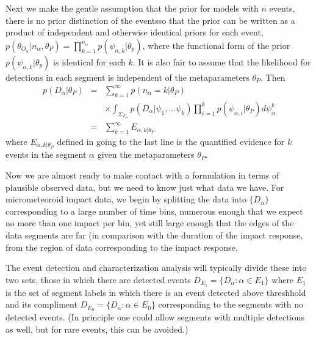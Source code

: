 \documentclass[twocolumn,showpacs,aps,prd,nobibnotes,nofootinbib,floatfix]{revtex4-1}
\begin{document}
Next we make the gentle assumption that the prior for models with $n$ events, there is no prior distinction of the eventsso that the prior can be written as a product of independent and otherwise identical priors for each event,$p(\theta_{O_\alpha}|n_\alpha,\theta_P)=\prod_{k{=}1}^{n_\alpha}p(\psi_{\alpha,k}|\theta_p)$, where the functional form of the prior $p(\psi_{\alpha,k}|\theta_p)$ is identical for each $k$.  It is also fair to assume that the likelihood for detections in each segment is independent of the metaparameters $\theta_P$. Then
\begin{eqnarray}
  p(D_\alpha|\theta_P)&=&\sum_{k{=}1}^{\infty}p(n_\alpha{=}k|\theta_P)\nonumber\\
  &&\times
  \int_{\Sigma_{E_\alpha}} p(D_\alpha|{\psi_1,...\psi_k}) \prod_{i{=}1}^k p(\psi_{\alpha,i}|\theta_P)d\psi_{\alpha}^k\nonumber\\
  &=&\sum_{k{=}1}^{\infty}E_{\alpha,k|\theta_P}\label{eq:sectionedLike}
\end{eqnarray}
where $E_{\alpha,k|\theta_P}$ defined in going to the last line is the quantified evidence for $k$ events in the segment $\alpha$ given the metaparameters $\theta_P$.

Now we are almost ready to make contact with a formulation in terms of plausible observed data, but we need to know just what data we have.  For micrometeoroid impact data, we begin by splitting the data into $\{D_\alpha\}$  corresponding to a large number of time bins, numerous enough that we expect no more than one impact per bin, yet still large enough that the edges of the data segments are far (in comparison with the duration of the impact response, from the region of data corresponding to the impact response.

The event detection and characterization analysis will typically divide these into two sets, those in which there are detected events $D_{E_1}=\{D_\alpha:\alpha\in E_1\}$ where $E_1$ is the set of segment labels in which there is an event detected above threshhold and its compliment $D_{E_0}=\{D_\alpha:\alpha\in E_0\}$ corresponding to the segments with no detected events. (In principle one could allow segments with multiple detections as well, but for rare events, this can be avoided.)
\end{document}
